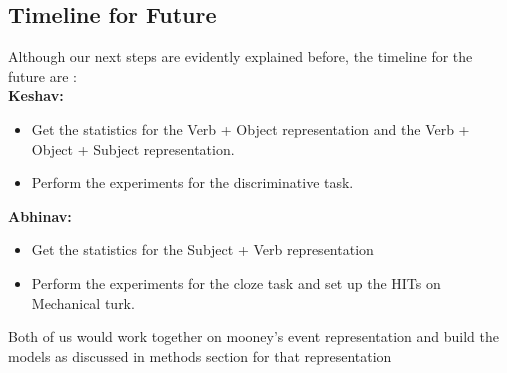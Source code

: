 \documentclass[11pt]{article}
\begin{document}
\subsection{Timeline for Future}
Although our next steps are evidently explained before, the timeline for the future are : \\
{\bf Keshav: }
\begin{itemize}
\item Get the statistics for the Verb + Object representation and the Verb + Object + Subject representation.
\item Perform the experiments for the discriminative task.
\end{itemize}
\smallskip
{\bf Abhinav: }
\begin{itemize}
\item Get the statistics for the Subject + Verb representation
\item Perform the experiments for the cloze task and set up the HITs on Mechanical turk.
\end{itemize}
Both of us would work together on mooney's event representation and build the models as discussed in methods section for that representation 
%





%
%
\end{document}
